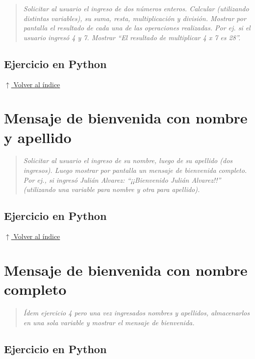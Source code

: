 \documentclass[12pt]{article}
\newcommand{\codigopython}[2]{%
}
\newcommand{\volverindice}{%
    \vspace{1em}%
    \begin{flushright}%
        \hyperlink{indice}{\small $\uparrow$ Volver al índice}%
    \end{flushright}%
}
\newcommand{\enunciado}[1]{%
    \begin{quote}
        \itshape #1
    \end{quote}
}
\begin{document}
\enunciado{Solicitar al usuario el ingreso de dos números enteros. Calcular (utilizando distintas variables), su suma, resta, multiplicación y división. Mostrar por pantalla el resultado de cada una de las operaciones realizadas. Por ej. si el usuario ingresó 4 y 7. Mostrar \enquote{El resultado de multiplicar 4 x 7 es 28}.}

\subsection*{Ejercicio en Python}

\codigopython{03}{Suma, resta, multiplicación y división de dos números}

\volverindice
\newpage


\section{Mensaje de bienvenida con nombre y apellido}

\enunciado{Solicitar al usuario el ingreso de su nombre, luego de su apellido (dos ingresos). Luego mostrar por pantalla un mensaje de bienvenida completo. Por ej., si ingresó Julián Alvarez: \enquote{¡¡Bienvenido Julián Alvarez!!} (utilizando una variable para nombre y otra para apellido).}

\subsection*{Ejercicio en Python}

\codigopython{04}{Mensaje de bienvenida con nombre y apellido}

\volverindice
\newpage


\section{Mensaje de bienvenida con nombre completo}

\enunciado{Ídem ejercicio 4 pero una vez ingresados nombres y apellidos, almacenarlos en una sola variable y mostrar el mensaje de bienvenida.}

\subsection*{Ejercicio en Python}
\end{document}
